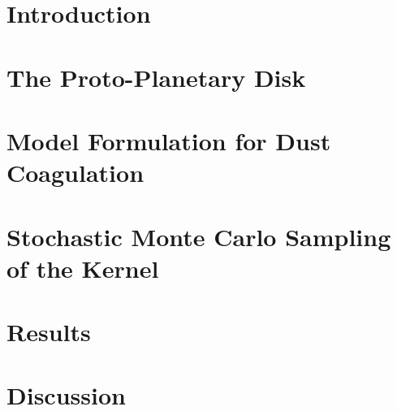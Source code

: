 \clearpage\chapter{Introduction}
    \label{ch:introduction}
    

\clearpage\chapter{The Proto-Planetary Disk}
    \label{ch:disk}
    
    

\clearpage\chapter{Model Formulation for Dust Coagulation}
    \label{ch:smoluchoswki}
    

\clearpage\chapter{Stochastic Monte Carlo Sampling of the Kernel}
    \label{ch:sampling}
    

\clearpage\chapter*{Results}
    \label{ch:results}
    

\clearpage\chapter{Discussion}
    \label{ch:discussion}
    
